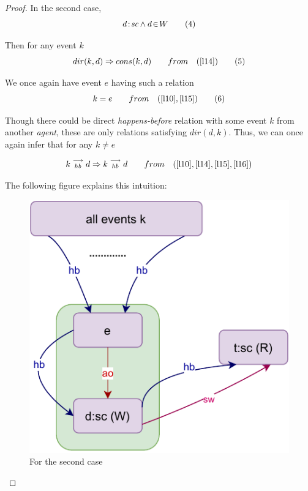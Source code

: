 \begin{proof}
        In the second case,
        \[
            d\!:\!\textit{sc} \wedge d\!\in\!W
            \tag{4}
            \label{l14}
        \]
        
        Then for any event $k$
        \[
            dir(k,d) \Rightarrow cons(k,d)
            \qquad from \quad
            (\ref{l14})
            \tag{5}
            \label{l15}
        \]
        
        We once again have event $e$ having such a relation 
        \[
            k = e 
            \qquad from \quad
            (\ref{l10}, \ref{l15})
            \tag{6}
            \label{l16}
        \]
        
        Though there could be direct \textit{happens-before} relation with some event $k$ from another \textit{agent}, these are only relations satisfying $dir(d,k)$. Thus, we can once again infer that for any $k \neq e$ 
        
        \[
            k\stackrel{\longrightarrow}{_{hb}}d \Rightarrow k\stackrel{\longrightarrow}{_{hb}}d
            \qquad from \quad
            (\ref{l10}, \ref{l14}, \ref{l15}, \ref{l16})
        \]
        
        The following figure explains this intuition: 
        
        \begin{figure}[H]
            \centering
            \includegraphics[scale=0.7]{Lemma_Proof1_Case2.pdf}
            \caption{For the second case}
            \label{fig:my_label}
        \end{figure}
        
    \end{proof}
    
